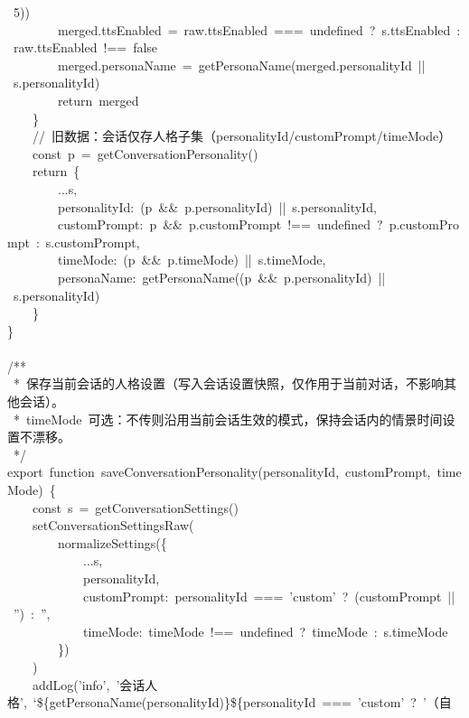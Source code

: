 \documentclass[a4paper,10pt]{article}
\begin{document}
{\ttfamily\footnotesize\raggedright
~5))\\
~~~~~~~~merged.ttsEnabled~=~raw.ttsEnabled~===~undefined~?~s.ttsEnabled~:~raw.ttsEnabled~!==~false\\
~~~~~~~~merged.personaName~=~getPersonaName(merged.personalityId~||~s.personalityId)\\
~~~~~~~~return~merged\\
~~~~\}\\
~~~~//~旧数据：会话仅存人格子集（personalityId/customPrompt/timeMode）\\
~~~~const~p~=~getConversationPersonality()\\
~~~~return~\{\\
~~~~~~~~...s,\\
~~~~~~~~personalityId:~(p~\&\&~p.personalityId)~||~s.personalityId,\\
~~~~~~~~customPrompt:~p~\&\&~p.customPrompt~!==~undefined~?~p.customPrompt~:~s.customPrompt,\\
~~~~~~~~timeMode:~(p~\&\&~p.timeMode)~||~s.timeMode,\\
~~~~~~~~personaName:~getPersonaName((p~\&\&~p.personalityId)~||~s.personalityId)\\
~~~~\}\\
\}\\
\mbox{}\\
/**\\
~*~保存当前会话的人格设置（写入会话设置快照，仅作用于当前对话，不影响其他会话）。\\
~*~timeMode~可选：不传则沿用当前会话生效的模式，保持会话内的情景时间设置不漂移。\\
~*/\\
export~function~saveConversationPersonality(personalityId,~customPrompt,~timeMode)~\{\\
~~~~const~s~=~getConversationSettings()\\
~~~~setConversationSettingsRaw(\\
~~~~~~~~normalizeSettings(\{\\
~~~~~~~~~~~~...s,\\
~~~~~~~~~~~~personalityId,\\
~~~~~~~~~~~~customPrompt:~personalityId~===~'custom'~?~(customPrompt~||~'')~:~'',\\
~~~~~~~~~~~~timeMode:~timeMode~!==~undefined~?~timeMode~:~s.timeMode\\
~~~~~~~~\})\\
~~~~)\\
~~~~addLog('info',~'会话人格',~`\$\{getPersonaName(personalityId)\}\$\{personalityId~===~'custom'~?~'（自\\
}
\end{document}
